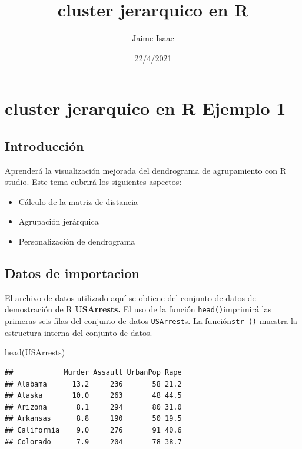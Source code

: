 \documentclass[
]{article}
\title{cluster jerarquico en R}
\author{Jaime Isaac}
\date{22/4/2021}
\newenvironment{Shaded}{\begin{snugshade}}{\end{snugshade}}
\newcommand{\FunctionTok}[1]{\textcolor[rgb]{0.00,0.00,0.00}{#1}}
\newcommand{\NormalTok}[1]{#1}
\providecommand{\tightlist}{%
  \setlength{\itemsep}{0pt}\setlength{\parskip}{0pt}}
\begin{document}
\maketitle

\hypertarget{cluster-jerarquico-en-r-ejemplo-1}{%
\section{cluster jerarquico en R Ejemplo
1}\label{cluster-jerarquico-en-r-ejemplo-1}}

\hypertarget{introducciuxf3n}{%
\subsection{Introducción}\label{introducciuxf3n}}

Aprenderá la visualización mejorada del dendrograma de agrupamiento con
R studio. Este tema cubrirá los siguientes aspectos:

\begin{itemize}
\tightlist
\item
  Cálculo de la matriz de distancia
\item
  Agrupación jerárquica
\item
  Personalización de dendrograma
\end{itemize}

\hypertarget{datos-de-importacion}{%
\subsection{Datos de importacion}\label{datos-de-importacion}}

El archivo de datos utilizado aquí se obtiene del conjunto de datos de
demostración de R \textbf{USArrests.} El uso de la función
\texttt{head()}imprimirá las primeras seis filas del conjunto de datos
\texttt{USArrest}s. La función\texttt{str\ ()} muestra la estructura
interna del conjunto de datos.

\begin{Shaded}
\begin{Highlighting}[]
\FunctionTok{head}\NormalTok{(USArrests)}
\end{Highlighting}
\end{Shaded}

\begin{verbatim}
##            Murder Assault UrbanPop Rape
## Alabama      13.2     236       58 21.2
## Alaska       10.0     263       48 44.5
## Arizona       8.1     294       80 31.0
## Arkansas      8.8     190       50 19.5
## California    9.0     276       91 40.6
## Colorado      7.9     204       78 38.7
\end{verbatim}
\end{document}
